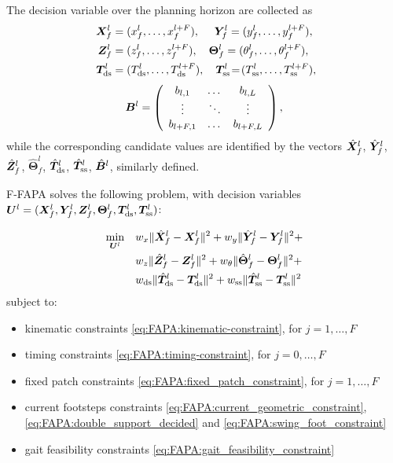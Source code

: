 The decision variable over the planning horizon are collected as
\begin{align*}
    {\bm{X}}_f^l & =  (x_f^l,\dots,x_f^{l+F}), \quad 
    \,\, {\bm{Y}}_f^l  =  (y_f^l,\dots,y_f^{l+F}), \\
    \,\, {\bm{Z}}_f^l & = (z_f^l,\dots,z_f^{l+F}), \quad
    \bm{\Theta}_f^l = (\theta_f^l,\dots,\theta_f^{l+F}), \\
    \,\, {\bm{T}}_{\rm ds}^l & =  (T_{\rm ds}^l,\dots,T_{\rm ds}^{l+F}), \quad {\bm{T}}_{\rm ss}^l \!=\! (T_{\rm ss}^l,\dots,T_{\rm ss}^{l+F}), 
\end{align*}
\begin{equation*}
{\bm{B}}^l = \left(
\begin{array}{ccc}b_{l,1} & \dots & b_{l,L}\\ \vdots & \ddots & \vdots \\ b_{l+F,1} & \dots & b_{l+F,L} \end{array}
\right),
\end{equation*}
while the corresponding candidate values are identified by the vectors
$\hat {{\bm{X}}}_f^l$, $\hat {{\bm{Y}}}_f^l$, $\hat {{\bm{Z}}}_f^l$, $\hat {\bm{\Theta}}_f^l$, $\hat {{\bm{T}}}^l_{\rm ds}$, $\hat {{\bm{T}}}^l_{\rm ss}$, $\hat {{\bm{B}}}^l$, similarly defined.

F-FAPA solves the following problem, with decision variables
${\bm{U}}^l = (\bm{X}_f^l, \bm{Y}_f^l, \bm{Z}_f^l, \bm{\Theta}_f^l, \bm{T}_{\rm ds}^l, \bm{T}_{\rm ss}^l)$:
\begin{braced}
    \begin{equation*}
        \begin{split}
            \min_{{\bm{U}}^l}\quad
            & w_x \| \hat{\bm{X}}_f^l - \bm{X}_f^l \|^2 + w_y \| \hat{\bm{Y}}_f^l - \bm{Y}_f^l \|^2 + \\& w_z \| \hat{\bm{Z}}_f^l - \bm{Z}_f^l \|^2 + w_{\theta} \| \hat{\bm{\Theta}}_f^l - \bm{\Theta}_f^l \|^2 + \\& w_{\rm ds} \| \hat{\bm{T}}_{\rm ds}^l - \bm{T}_{\rm ds}^l \|^2 + w_{\rm ss} \| \hat{\bm{T}}_{\rm ss}^l - \bm{T}_{\rm ss}^l \|^2
        \end{split}
    \end{equation*}
    \hspace{0.25cm} subject to:
    \begin{itemize}
        \item kinematic constraints \eqref{eq:FAPA:kinematic-constraint}, for $j=1,\dots,F$
        \item timing constraints \eqref{eq:FAPA:timing-constraint}, for $j=0,\dots,F$
        \item fixed patch constraints \eqref{eq:FAPA:fixed_patch_constraint}, for $j=1,\dots,F$
        \item current footsteps constraints \eqref{eq:FAPA:current_geometric_constraint}, \eqref{eq:FAPA:double_support_decided} and \eqref{eq:FAPA:swing_foot_constraint}
        \item gait feasibility constraints \eqref{eq:FAPA:gait_feasibility_constraint}
    \end{itemize}
\end{braced}

